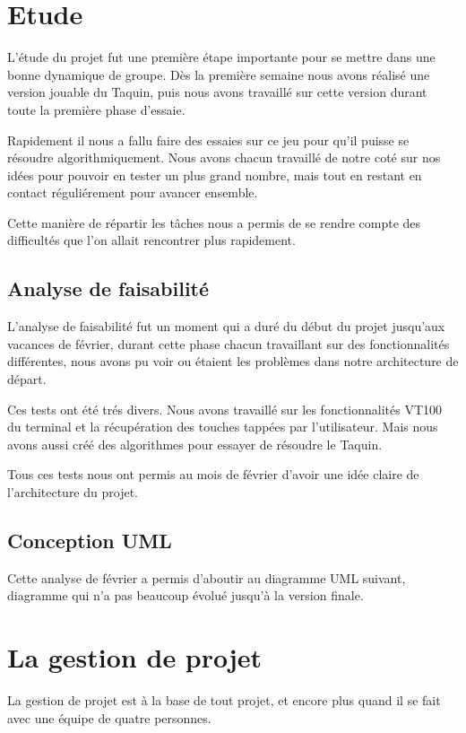 ﻿\documentclass[a4paper,twoside,12pt]{report}
\begin{document}
%
\chapter{Etude}
\par
L'étude du projet fut une première étape importante pour se mettre dans une bonne dynamique de groupe. Dès la première semaine nous avons réalisé une version jouable du Taquin, puis nous avons travaillé sur cette version durant toute la première phase d'essaie.
\par\noindent
Rapidement il nous a fallu faire des essaies sur ce jeu pour qu'il puisse se résoudre algorithmiquement. Nous avons chacun travaillé de notre coté sur nos idées pour pouvoir en tester un plus grand nombre, mais tout en restant en contact réguliérement pour avancer ensemble.
\par\noindent
Cette manière de répartir les tâches nous a permis de se rendre compte des difficultés que l'on allait rencontrer plus rapidement.
%
\section{Analyse de faisabilité}
\par
L'analyse de faisabilité fut un moment qui a duré du début du projet jusqu'aux vacances de février, durant cette phase chacun travaillant sur des fonctionnalités différentes, nous avons pu voir ou étaient les problèmes dans notre architecture de départ.
\par\noindent
Ces tests ont été trés divers. Nous avons travaillé sur les fonctionnalités VT100 du terminal et la récupération des touches tappées par l'utilisateur. Mais nous avons aussi créé des algorithmes pour essayer de résoudre le Taquin.
\par\noindent
Tous ces tests nous ont permis au mois de février d'avoir une idée claire de l'architecture du projet.
\section{Conception UML}
\par
Cette analyse de février a permis d'aboutir au diagramme UML suivant, diagramme qui n'a pas beaucoup évolué jusqu'à la version finale.
\chapter{La gestion de projet}
%
\par
La gestion de projet est à la base de tout projet, et encore plus quand il se fait avec une équipe de quatre personnes.
\end{document}
